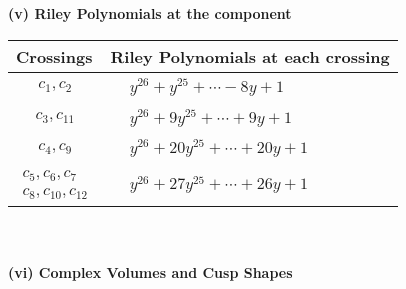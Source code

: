 \documentclass[1p]{elsarticle_modified}
\theoremstyle{definition}
\begin{document}
\newpage\renewcommand{\arraystretch}{1}
\flushleft \textbf{(v) Riley Polynomials at the component}\newline \\
\begin{tabular}{m{50pt}|m{274pt}}
Crossings & \hspace{64pt}Riley Polynomials at each crossing \\
\hline $$\begin{aligned}c_{1},c_{2}\end{aligned}$$&$\begin{aligned}
&y^{26}+y^{25}+\cdots-8 y+1
\end{aligned}$\\
\hline $$\begin{aligned}c_{3},c_{11}\end{aligned}$$&$\begin{aligned}
&y^{26}+9 y^{25}+\cdots+9 y+1
\end{aligned}$\\
\hline $$\begin{aligned}c_{4},c_{9}\end{aligned}$$&$\begin{aligned}
&y^{26}+20 y^{25}+\cdots+20 y+1
\end{aligned}$\\
\hline $$\begin{aligned}c_{5},c_{6},c_{7}\\c_{8},c_{10},c_{12}\end{aligned}$$&$\begin{aligned}
&y^{26}+27 y^{25}+\cdots+26 y+1
\end{aligned}$\\
\hline
\end{tabular}\\~\\
\newpage\flushleft \textbf{(vi) Complex Volumes and Cusp Shapes}
\end{document}
